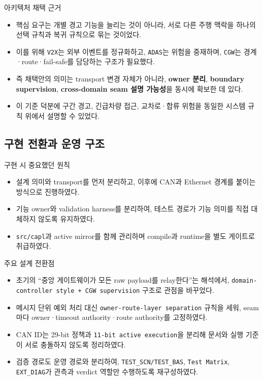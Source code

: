 \documentclass[aspectratio=169,10pt]{beamer}
\begin{document}
\begin{frame}{아키텍처 채택 근거}
\begin{itemize}
  \item 핵심 요구는 개별 경고 기능을 늘리는 것이 아니라, 서로 다른 주행 맥락을 하나의 선택 규칙과 복귀 규칙으로 묶는 것이었다.
  \item 이를 위해 \texttt{V2X}는 외부 이벤트를 정규화하고, \texttt{ADAS}는 위험을 중재하며, \texttt{CGW}는 경계·route·fail-safe를 담당하는 구조가 필요했다.
  \item 즉 채택안의 의미는 transport 변경 자체가 아니라, \textbf{owner 분리}, \textbf{boundary supervision}, \textbf{cross-domain seam 설명 가능성}을 동시에 확보한 데 있다.
  \item 이 기준 덕분에 구간 경고, 긴급차량 접근, 교차로·합류 위험을 동일한 시스템 규칙 위에서 설명할 수 있었다.
\end{itemize}
\end{frame}

\subsection{구현 전환과 운영 구조}
\begin{frame}{구현 시 중요했던 원칙}
\begin{itemize}
  \item 설계 의미와 transport를 먼저 분리하고, 이후에 CAN과 Ethernet 경계를 붙이는 방식으로 진행하였다.
  \item 기능 owner와 validation harness를 분리하여, 테스트 경로가 기능 의미를 직접 대체하지 않도록 유지하였다.
  \item \texttt{src/capl}과 active mirror를 함께 관리하며 compile과 runtime을 별도 게이트로 취급하였다.
\end{itemize}
\end{frame}

\begin{frame}{주요 설계 전환점}
\begin{itemize}
  \item 초기의 ``중앙 게이트웨이가 모든 raw payload를 relay한다''는 해석에서, \texttt{domain-controller style + CGW supervision} 구조로 관점을 바꾸었다.
  \item 메시지 단위 예외 처리 대신 \texttt{owner-route-layer separation} 규칙을 세워, seam마다 owner·timeout authority·route authority를 고정하였다.
  \item CAN ID는 29-bit 정책과 \texttt{11-bit active execution}을 분리해 문서와 실행 기준이 서로 충돌하지 않도록 정리하였다.
  \item 검증 경로도 운영 경로와 분리하여, \texttt{TEST\_SCN/TEST\_BAS}, \texttt{Test Matrix}, \texttt{EXT\_DIAG}가 관측과 verdict 역할만 수행하도록 재구성하였다.
\end{itemize}
\end{frame}
\end{document}
